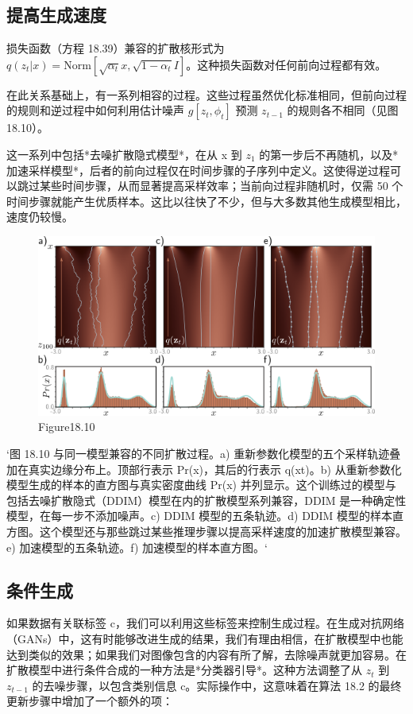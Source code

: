\subsection{提高生成速度}
损失函数（方程 18.39）兼容的扩散核形式为 \(q(z_t|x) = \text{Norm}[ \sqrt{\alpha_t}x, \sqrt{1 - \alpha_t} I ]\)。这种损失函数对任何前向过程都有效。

在此关系基础上，有一系列相容的过程。这些过程虽然优化标准相同，但前向过程的规则和逆过程中如何利用估计噪声 \( g[z_t, \phi_t] \) 预测 \(z_{t-1}\) 的规则各不相同（见图 18.10）。

这一系列中包括*去噪扩散隐式模型*，在从 x 到 \(z_1\) 的第一步后不再随机，以及*加速采样模型*，后者的前向过程仅在时间步骤的子序列中定义。这使得逆过程可以跳过某些时间步骤，从而显著提高采样效率；当前向过程非随机时，仅需 50 个时间步骤就能产生优质样本。这比以往快了不少，但与大多数其他生成模型相比，速度仍较慢。

\begin{figure}[h!]
\centering
\includegraphics[width=0.7\linewidth]{png/chapter18/DiffusionImplicit.png}
\caption{Figure18.10}
\end{figure}

`图 18.10 与同一模型兼容的不同扩散过程。a) 重新参数化模型的五个采样轨迹叠加在真实边缘分布上。顶部行表示 Pr(x)，其后的行表示 q(xt)。b) 从重新参数化模型生成的样本的直方图与真实密度曲线 Pr(x) 并列显示。这个训练过的模型与包括去噪扩散隐式（DDIM）模型在内的扩散模型系列兼容，DDIM 是一种确定性模型，在每一步不添加噪声。c) DDIM 模型的五条轨迹。d) DDIM 模型的样本直方图。这个模型还与那些跳过某些推理步骤以提高采样速度的加速扩散模型兼容。e) 加速模型的五条轨迹。f) 加速模型的样本直方图。`

\subsection{条件生成}
如果数据有关联标签 c，我们可以利用这些标签来控制生成过程。在生成对抗网络（GANs）中，这有时能够改进生成的结果，我们有理由相信，在扩散模型中也能达到类似的效果；如果我们对图像包含的内容有所了解，去除噪声就更加容易。在扩散模型中进行条件合成的一种方法是*分类器引导*。这种方法调整了从 \(z_t\) 到 \(z_{t-1}\) 的去噪步骤，以包含类别信息 c。实际操作中，这意味着在算法 18.2 的最终更新步骤中增加了一个额外的项：

